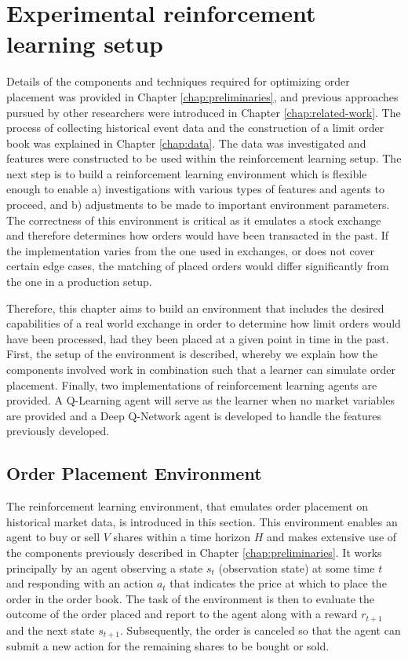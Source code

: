 \chapter{Experimental reinforcement learning setup}
\label{chap:setup}

Details of the components and techniques required for optimizing order placement was provided in Chapter \ref{chap:preliminaries}, and previous approaches pursued by other researchers were introduced in Chapter \ref{chap:related-work}.
The process of collecting historical event data and the construction of a limit order book was explained in Chapter \ref{chap:data}.
The data was investigated and features were constructed to be used within the reinforcement learning setup.
The next step is to build a reinforcement learning environment which is flexible enough to enable a) investigations with various types of features and agents to proceed, and b) adjustments to be made to important environment parameters.
The correctness of this environment is critical as it emulates a stock exchange and therefore determines how orders would have been transacted in the past.
If the implementation varies from the one used in exchanges, or does not cover certain edge cases, the matching of placed orders would differ significantly from the one in a production setup.

Therefore, this chapter aims to build an environment that includes the desired capabilities of a real world exchange in order to determine how limit orders would have been processed, had they been placed at a given point in time in the past.
First, the setup of the environment is described, whereby we explain how the components involved work in combination such that a learner can simulate order placement.
Finally, two implementations of reinforcement learning agents are provided.
A Q-Learning agent will serve as the learner when no market variables are provided and a Deep Q-Network agent is developed to handle the features previously developed.

\section{Order Placement Environment}
\label{sec:setup-order-placement}

The reinforcement learning environment, that emulates order placement on historical market data, is introduced in this section.
This environment enables an agent to buy or sell $V$ shares within a time horizon $H$ and makes extensive use of the components previously described in Chapter \ref{chap:preliminaries}.
It works principally by an agent observing a state $s_t$ (observation state) at some time $t$ and responding with an action $a_t$ that indicates the price at which to place the order in the order book.
The task of the environment is then to evaluate the outcome of the order placed and report to the agent along with a reward $r_{t+1}$ and the next state $s_{t+1}$.
Subsequently, the order is canceled so that the agent can submit a new action for the remaining shares to be bought or sold.

